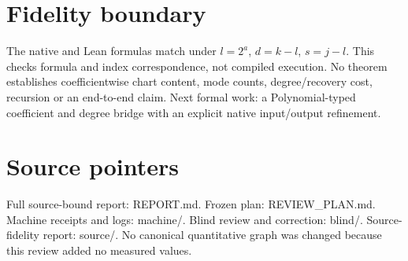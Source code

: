 \documentclass[10pt]{article}
\begin{document}
\section*{Fidelity boundary}
The native and Lean formulas match under $l=2^a$, $d=k-l$, $s=j-l$. This checks formula and index correspondence, not compiled execution. No theorem establishes coefficientwise chart content, mode counts, degree/recovery cost, recursion or an end-to-end claim. Next formal work: a Polynomial-typed coefficient and degree bridge with an explicit native input/output refinement.
\section*{Source pointers}
Full source-bound report: REPORT.md. Frozen plan: REVIEW\_PLAN.md. Machine receipts and logs: machine/. Blind review and correction: blind/. Source-fidelity report: source/. No canonical quantitative graph was changed because this review added no measured values.
\end{document}
